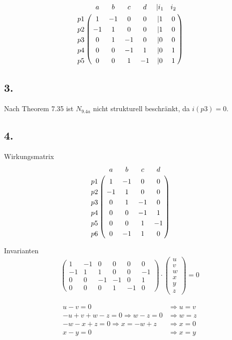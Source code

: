 \documentclass[a4paper,12pt]{scrartcl}
\begin{document}
\begin{align}
\bordermatrix{
   &  a	&  b &  c &  d & | i_1 & i_2 \cr
p1 &  1 & -1 &  0 &  0 &   | 1 &   0 \cr
p2 & -1 &  1 &  0 &  0 &   | 1 &   0 \cr
p3 &  0 &  1 & -1 &  0 &   | 0 &   0 \cr
p4 &  0 &  0 & -1 &  1 &   | 0 &   1 \cr
p5 &  0 &  0 &  1 & -1 &   | 0 &   1 \cr}
\end{align}

\subsection{3.}
Nach Theorem 7.35 ist $N_{9.4a}$ nicht strukturell beschränkt, da $i(p3) = 0$.

\subsection{4.}
Wirkungsmatrix
\begin{align}
\bordermatrix{
   &  a	&  b &  c &  d \cr
p1 &  1 & -1 &  0 &  0 \cr
p2 & -1 &  1 &  0 &  0 \cr
p3 &  0 &  1 & -1 &  0 \cr
p4 &  0 &  0 & -1 &  1 \cr
p5 &  0 &  0 &  1 & -1 \cr
p6 &  0 & -1 &  1 &  0 \cr}
\end{align} 

Invarianten
\begin{align}
\left(
   \begin{array}{cccccc}
     1 & -1 &  0 &  0 &  0 &  0\\
    -1 &  1 &  1 &  0 &  0 & -1\\
     0 &  0 & -1 & -1 &  0 &  1\\
     0 &  0 &  0 &  1 & -1 &  0
   \end{array}
\right)
\cdot
\left(
   \begin{array}{c}
   u \\
   v \\
   w \\
   x \\
   y \\
   z 
   \end{array}
\right)
= 0 
\end{align}

\begin{align}
u - v = 0 			&\Rightarrow u = v \\
-u + v + w - z = 0 	\Rightarrow w - z = 0 	&\Rightarrow w = z\\
-w - x + z = 0 		\Rightarrow x = -w + z  &\Rightarrow x = 0\\
x - y = 0			&\Rightarrow x = y
\end{align}
\end{document}
